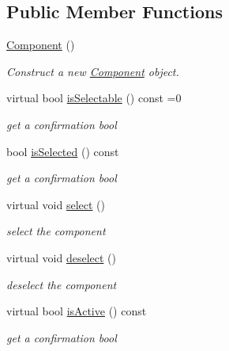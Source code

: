 \subsection*{Public Member Functions}
\begin{DoxyCompactItemize}
\item 
\mbox{\label{classComponent_a8775db6d1a2c1afc2e77cd3c8f39da6f}} 
\hyperlink{classComponent_a8775db6d1a2c1afc2e77cd3c8f39da6f}{Component} ()
\begin{DoxyCompactList}\small\item\em Construct a new \hyperlink{classComponent}{Component} object. \end{DoxyCompactList}\item 
virtual bool \hyperlink{classComponent_aede74a18a443413465216f383a046028}{is\+Selectable} () const =0
\begin{DoxyCompactList}\small\item\em get a confirmation bool \end{DoxyCompactList}\item 
bool \hyperlink{classComponent_a4c480061afaabc44339ca63916711294}{is\+Selected} () const
\begin{DoxyCompactList}\small\item\em get a confirmation bool \end{DoxyCompactList}\item 
\mbox{\label{classComponent_ad92e03b1674737ed690eb72a0ad507f2}} 
virtual void \hyperlink{classComponent_ad92e03b1674737ed690eb72a0ad507f2}{select} ()
\begin{DoxyCompactList}\small\item\em select the component \end{DoxyCompactList}\item 
\mbox{\label{classComponent_abe3bf558cf657c6da9ac30929fce5ed2}} 
virtual void \hyperlink{classComponent_abe3bf558cf657c6da9ac30929fce5ed2}{deselect} ()
\begin{DoxyCompactList}\small\item\em deselect the component \end{DoxyCompactList}\item 
virtual bool \hyperlink{classComponent_ad9a1fae6416df7f295c603483f15ce4a}{is\+Active} () const
\begin{DoxyCompactList}\small\item\em get a confirmation bool \end{DoxyCompactList}\item 

\end{DoxyCompactItemize}
